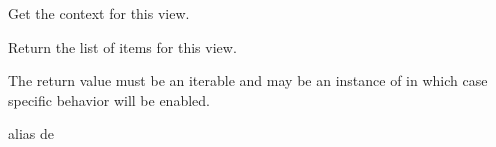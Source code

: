 \documentclass[letterpaper,10pt,spanish]{sphinxmanual}
\begin{document}
\begin{fulllineitems}

\pysigstartsignatures
{}
\pysigstopsignatures

\begin{fulllineitems}

\pysigstartsignatures
{}
\pysigstopsignatures
\end{fulllineitems}



\begin{fulllineitems}

\pysigstartsignatures
{}
\pysigstopsignatures
\sphinxAtStartPar
Get the context for this view.

\end{fulllineitems}



\begin{fulllineitems}

\pysigstartsignatures
{}
\pysigstopsignatures
\sphinxAtStartPar
Return the list of items for this view.

\sphinxAtStartPar
The return value must be an iterable and may be an instance of
 in which case  specific behavior will be enabled.

\end{fulllineitems}



\begin{fulllineitems}

\pysigstartsignatures
{}
\pysigstopsignatures
\sphinxAtStartPar
alias de 

\end{fulllineitems}



\begin{fulllineitems}

\pysigstartsignatures
{}
\pysigstopsignatures
\end{fulllineitems}


\end{fulllineitems}
\end{document}
